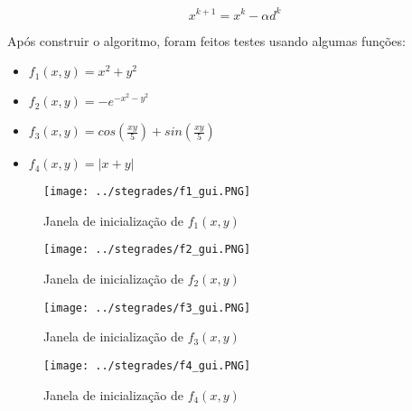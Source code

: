 \begin{equation}
	x^{k+1} = x^k - \alpha d^k
	\end{equation}
	
Após construir o algoritmo, foram feitos testes usando algumas funções:

\begin{itemize}
	\item $ f_1(x,y) = x^2 + y^2$
	\item $ f_2(x,y) = -e^{-x^2 -y^2}$
	\item $ f_3(x,y) = cos(\frac{xy}{5})+sin(\frac{xy}{5}) $
	\item $ f_4(x,y) = |x+y| $
\end{itemize}


\newpage

\begin{figure}[H]
	\begin{center}	
		\texttt{[image: ../stegrades/f1\_gui.PNG]}
		\caption{Janela de inicialização de $ f_1(x,y) $}
		\label{fig:f1_gui}
	\end{center}
\end{figure}



\begin{figure}[H]
	\begin{center}	
		\texttt{[image: ../stegrades/f2\_gui.PNG]}
		\caption{Janela de inicialização de $ f_2(x,y) $}
		\label{fig:f2_gui}
	\end{center}
\end{figure}



\begin{figure}[H]
	\begin{center}	
		\texttt{[image: ../stegrades/f3\_gui.PNG]}
		\caption{Janela de inicialização de $ f_3(x,y) $}
		\label{fig:f3_gui}
	\end{center}
\end{figure}



\begin{figure}[H]
	\begin{center}	
		\texttt{[image: ../stegrades/f4\_gui.PNG]}
		\caption{Janela de inicialização de $ f_4(x,y) $}
		\label{fig:f4_gui}
	\end{center}
\end{figure}






\newpage



